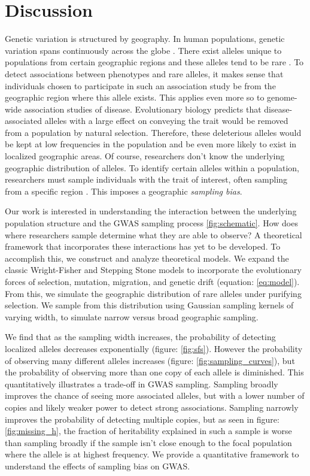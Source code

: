 \chapter{Discussion}
Genetic variation is structured by geography. In human populations, genetic variation spans continuously across the globe \cite{novembre_interpreting_2008}\cite{1k_genomes}. There exist alleles unique to populations from certain geographic regions and these alleles tend to be rare \cite{slatkin_isolation_1993}\cite{marcus_visualizing_2017}. To detect associations between phenotypes and rare alleles, it makes sense that individuals chosen to participate in such an association study be from the geographic region where this allele exists. This applies even more so to genome-wide association studies of disease. Evolutionary biology predicts that disease-associated alleles with a large effect on conveying the trait would be removed from a population by natural selection. Therefore, these deleterious alleles would be kept at low frequencies in the population and be even more likely to exist in localized geographic areas. Of course, researchers don't know the underlying geographic distribution of alleles. To identify certain alleles within a population, researchers must sample individuals with the trait of interest, often sampling from a specific region \cite{bycroft_uk_2018} \cite{1k_genomes}. This imposes a geographic \textit{sampling bias}.


Our work is interested in understanding the interaction between the underlying population structure and the GWAS sampling process \ref{fig:schematic}. How does where researchers sample determine what they are able to observe? A theoretical framework that incorporates these interactions has yet to be developed. To accomplish this, we construct and analyze theoretical models. We expand the classic Wright-Fisher \cite{wright_evolution_1931} \cite{fisher_mathematical_1922} and Stepping Stone models \cite{kimura_stepping_1964} to incorporate the evolutionary forces of selection, mutation, migration, and genetic drift (equation: \ref{eq:model}). From this, we simulate the geographic distribution of rare alleles under purifying selection. We sample from this distribution using Gaussian sampling kernels of varying width, to simulate narrow versus broad geographic sampling. 


We find that as the sampling width increases, the probability of detecting localized alleles decreases exponentially (figure: \ref{fig:sfs}). However the probability of observing many different alleles increases (figure: \ref{fig:sampling_curves}), but the probability of observing more than one copy of each allele is diminished. This quantitatively illustrates a trade-off in GWAS sampling. Sampling broadly improves the chance of seeing more associated alleles, but with a lower number of copies and likely weaker power to detect strong associations. Sampling narrowly improves the probability of detecting multiple copies, but as seen in figure: \ref{fig:missing_h}, the fraction of heritability explained in such a sample is worse than sampling broadly if the sample isn't close enough to the focal population where the allele is at highest frequency. We provide a quantitative framework to understand the effects of sampling bias on GWAS. 


